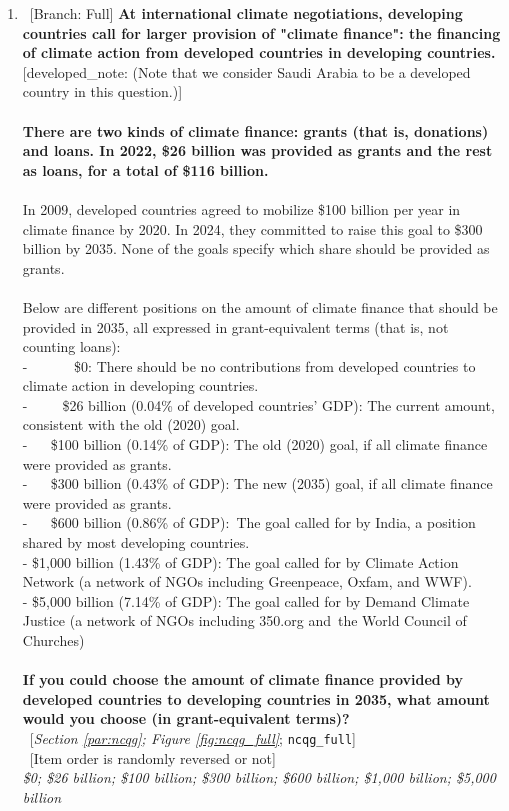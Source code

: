 \begin{enumerate}[resume]
\item ~[Branch: Full] \label{q:ncqg_full} \textbf{At international climate negotiations, developing countries call for larger provision of "climate finance": the financing of climate action from developed countries in developing countries.} [developed\_note: (Note that we consider Saudi Arabia to be a developed country in this question.)]\\\\\textbf{There are two kinds of climate finance: grants (that is, donations) and loans. In 2022, \$26 billion was provided as grants and the rest as loans, for a total of \$116 billion.~}\\\\In 2009, developed countries agreed to mobilize \$100 billion per year in climate finance by 2020. In 2024, they committed to raise this goal to \$300 billion by 2035. None of the goals specify which share should be provided as grants.\\\\Below are different positions on the amount of climate finance that should be provided in 2035, all expressed in grant-equivalent terms (that is, not counting loans):\\-~ ~ ~ ~ \$0: There should be no contributions from developed countries to climate action in developing countries.\\-~ ~ ~ \$26 billion (0.04\% of developed countries' GDP): The current amount, consistent with the old (2020) goal.\\-~ ~ \$100 billion (0.14\% of GDP): The old (2020) goal, if all climate finance were provided as grants.\\-~ ~ \$300 billion (0.43\% of GDP): The new (2035) goal, if all climate finance were provided as grants.\\-~ ~ \$600 billion (0.86\% of GDP):~The goal called for by India, a position shared by most developing countries.\\- \$1,000 billion (1.43\% of GDP): The goal called for by Climate Action Network (a network of NGOs including Greenpeace, Oxfam, and WWF).\\- \$5,000 billion (7.14\% of GDP): The goal called for by Demand Climate Justice (a network of NGOs including 350.org and~the World Council of Churches)\\\\\textbf{If you could choose the amount of climate finance provided by developed countries to developing countries in 2035, what amount would you choose (in grant-equivalent terms)?}\\ 
~[\textit{Section \ref{par:ncqg}; Figure \ref{fig:ncqg_full}}; 
\verb|ncqg_full|]\\
~[Item order is randomly reversed or not]
  \\ \textit{\$0; \$26 billion; \$100 billion; \$300 billion; \$600 billion; \$1,000 billion; \$5,000 billion}


\end{enumerate}

